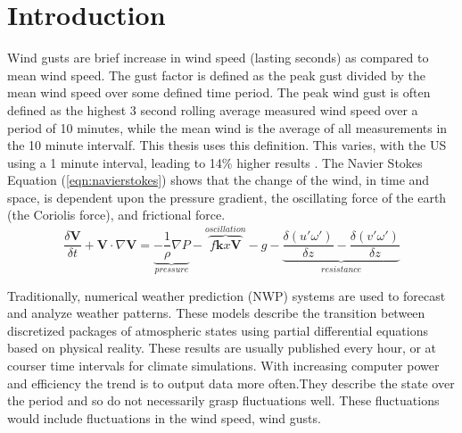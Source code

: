 
\chapter{Introduction} %

\label{Chapter1} %


\newcommand{\keyword}[1]{\textbf{#1}}
\newcommand{\tabhead}[1]{\textbf{#1}}
\newcommand{\code}[1]{\texttt{#1}}
\newcommand{\file}[1]{\texttt{\bfseries#1}}
\newcommand{\option}[1]{\texttt{\itshape#1}}

Wind gusts are brief increase in wind speed (lasting seconds) as compared to mean wind speed. The gust factor is defined as the peak gust divided by the mean wind speed over some defined time period. The peak wind gust is often defined as the highest 3 second rolling average measured wind speed over a period of 10 minutes, while the mean wind is the average of all measurements in the 10 minute intervalf. This thesis uses this definition. This varies, with the US using a 1 minute interval, leading to 14\% higher results \cite{why_wind_gusts}. The Navier Stokes Equation (\ref{eqn:navierstokes}) shows that the change of the wind, in time and space, is dependent upon the pressure gradient, the oscillating force of the earth (the Coriolis force), and frictional force.\cite{uncertainties_in_numerical_weather_predictions}
\begin{equation}
    \label{eqn:navierstokes}
    \frac{\delta \mathbf{V}}{\delta t} + \mathbf{V}\cdot\nabla\mathbf{V} = \underbrace{-\frac{1}{\rho}\nabla P}_{pressure} -\overbrace{ f\mathbf{k}x\mathbf{V}}^{oscillation} - g - \underbrace{\frac{\delta(u'\omega')}{\delta z} - \frac{\delta(v'\omega')}{\delta z}}_{resistance}
\end{equation}

Traditionally, numerical weather prediction (NWP) systems are used to forecast and analyze weather patterns\cite{medium_range_3d_weather_forecasting_NN}. These models describe the transition between discretized packages of atmospheric states using partial differential equations based on physical reality. These results are usually published every hour, or at courser time intervals for climate simulations. With increasing computer power and efficiency the trend is to output data more often\cite{GNP_vidtal}.They describe the state over the period and so do not necessarily grasp fluctuations well. These fluctuations would include fluctuations in the wind speed, wind gusts\cite{canNNBeatNWP}.

